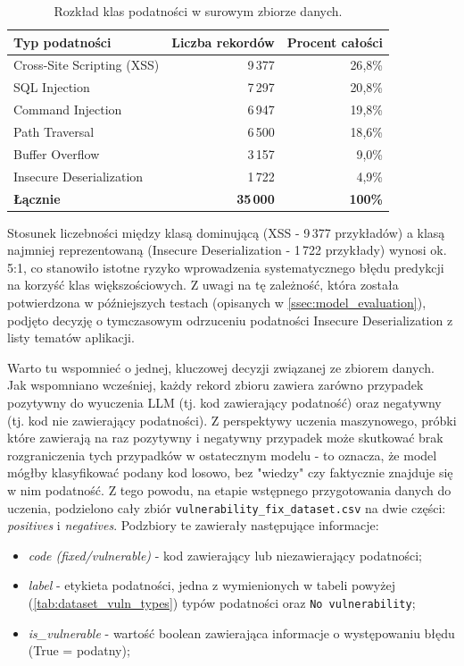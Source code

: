 \documentclass[12pt,a4paper]{article}
\begin{document}
\begin{table}[H]
    \centering
    \begin{tabular}{lrr}
        \toprule
        \textbf{Typ podatności}         & \textbf{Liczba rekordów} & \textbf{Procent całości} \\
        \midrule
        Cross-Site Scripting (XSS)      & 9\,377  & 26{,}8\% \\
        SQL Injection                   & 7\,297  & 20{,}8\% \\
        Command Injection               & 6\,947  & 19{,}8\% \\
        Path Traversal                  & 6\,500  & 18{,}6\% \\
        Buffer Overflow                 & 3\,157  & 9{,}0\%  \\
        Insecure Deserialization        & 1\,722  & 4{,}9\%  \\
        \midrule
        \textbf{Łącznie}                & \textbf{35\,000} & \textbf{100\%} \\
        \bottomrule
    \end{tabular}
    \caption{Rozkład klas podatności w surowym zbiorze danych.}
\end{table}
\label{tab:dataset_vuln_types}

Stosunek liczebności między klasą dominującą (XSS - 9\,377 przykładów) a klasą najmniej reprezentowaną (Insecure Deserialization - 1\,722 przykłady) wynosi ok. 5:1, 
co stanowiło istotne ryzyko wprowadzenia systematycznego błędu predykcji na korzyść klas większościowych. Z uwagi na tę zależność, która została potwierdzona 
w późniejszych testach (opisanych w \ref{ssec:model_evaluation}), podjęto decyzję o tymczasowym odrzuceniu podatności Insecure Deserialization z listy tematów aplikacji. 

Warto tu wspomnieć o jednej, kluczowej decyzji związanej ze zbiorem danych. Jak wspomniano wcześniej, każdy rekord zbioru zawiera zarówno przypadek pozytywny do wyuczenia LLM
(tj. kod zawierający podatność) oraz negatywny (tj. kod nie zawierający podatności). Z perspektywy uczenia maszynowego, próbki które zawierają na raz pozytywny i negatywny 
przypadek może skutkować brak rozgraniczenia tych przypadków w ostatecznym modelu - to oznacza, że model mógłby klasyfikować podany kod losowo, bez "wiedzy"
czy faktycznie znajduje się w nim podatność. Z tego powodu, na etapie wstępnego przygotowania danych do uczenia, podzielono cały zbiór \texttt{vulnerability\_fix\_dataset.csv} na 
dwie części: \emph{positives} i \emph{negatives}. Podzbiory te zawierały następujące informacje:
\begin{itemize}
    \item \textit{code (fixed/vulnerable)} - kod zawierający lub niezawierający podatności;
    \item \textit{label} - etykieta podatności, jedna z wymienionych w tabeli powyżej (\ref{tab:dataset_vuln_types}) typów podatności oraz \texttt{No vulnerability};
    \item \textit{is\_vulnerable} - wartość boolean zawierająca informacje o występowaniu błędu (True = podatny);
\end{itemize}
\end{document}
